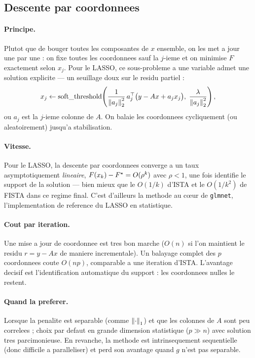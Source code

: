 \subsection{Descente par coordonnees}

\paragraph{Principe.} Plutot que de bouger toutes les composantes de $x$
ensemble, on les met a jour une par une : on fixe toutes les coordonnees sauf la
$j$-ieme et on minimise $F$ exactement selon $x_j$. Pour le LASSO, ce
sous-probleme a une variable admet une solution explicite --- un seuillage doux
sur le residu partiel :
\[
  x_j \leftarrow \operatorname{soft\_threshold}\!\left(
    \frac{1}{\left\lVert a_j \right\rVert_2^{2}}\, a_j^{\top}\big(y - A x + a_j x_j\big),\;
    \frac{\lambda}{\left\lVert a_j \right\rVert_2^{2}}
  \right),
\]
ou $a_j$ est la $j$-ieme colonne de $A$. On balaie les coordonnees cycliquement
(ou aleatoirement) jusqu'a stabilisation.

\paragraph{Vitesse.} Pour le LASSO, la descente par coordonnees converge a un
taux asymptotiquement \emph{lineaire}, $F(x_k) - F^{\star} = O(\rho^{k})$ avec
$\rho < 1$, une fois identifie le support de la solution --- bien mieux que le
$O(1/k)$ d'ISTA et le $O(1/k^2)$ de FISTA dans ce regime final. C'est d'ailleurs
la methode au c\oe ur de \texttt{glmnet}, l'implementation de reference du LASSO
en statistique.

\paragraph{Cout par iteration.} Une mise a jour de coordonnee est tres bon
marche ($O(n)$ si l'on maintient le residu $r = y - Ax$ de maniere
incrementale). Un balayage complet des $p$ coordonnees coute $O(np)$, comparable
a une iteration d'ISTA. L'avantage decisif est l'identification automatique du
support : les coordonnees nulles le restent.

\paragraph{Quand la preferer.} Lorsque la penalite est separable (comme
$\left\lVert \cdot \right\rVert_1$) et que les colonnes de $A$ sont peu correlees ; choix par
defaut en grande dimension statistique ($p \gg n$) avec solution tres
parcimonieuse. En revanche, la methode est intrinsequement sequentielle (donc
difficile a paralleliser) et perd son avantage quand $g$ n'est pas separable.

